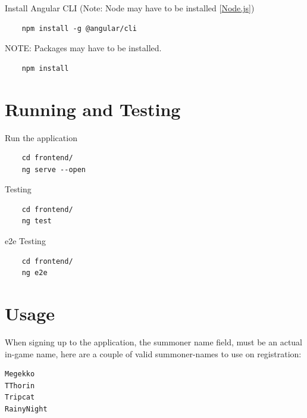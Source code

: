 Install Angular CLI (Note: Node may have to be installed [\href{https://nodejs.org/en/}{Node.js}])
\begin{verbatim}
	npm install -g @angular/cli
\end{verbatim}

NOTE: Packages may have to be installed.
\begin{verbatim}
	npm install
\end{verbatim}

\newpage
\section{Running and Testing}
Run the application
\begin{verbatim}
	cd frontend/
	ng serve --open
\end{verbatim}

Testing
\begin{verbatim}
	cd frontend/
	ng test
\end{verbatim}

e2e Testing
\begin{verbatim}
	cd frontend/
	ng e2e
\end{verbatim}

\section{Usage}
When signing up to the application, the summoner name field, must be an actual in-game name, here are a couple of valid summoner-names to use on registration:
\begin{verbatim}
Megekko
TThorin
Tripcat
RainyNight
\end{verbatim}


